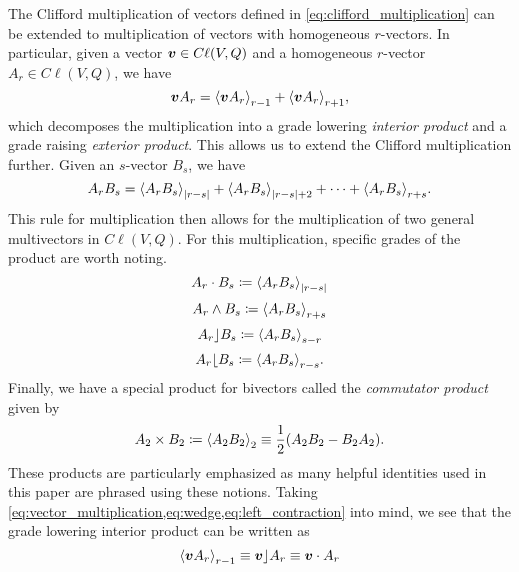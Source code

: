 The Clifford multiplication of vectors defined in \ref{eq:clifford_multiplication} can be extended to multiplication of vectors with homogeneous $r$-vectors.  In particular, given a vector $\blade{v} \in C\ell(V,Q)$ and a homogeneous $r$-vector $A_r \in C\ell(V,Q)$, we have
\begin{equation}
\label{eq:vector_multiplication}
\blade{v}A_r = \proj{r-1}{\blade{v}A_r} + \proj{r+1}{\blade{v}A_r},
\end{equation}
which decomposes the multiplication into a grade lowering \emph{interior product} and a grade raising \emph{exterior product}.  This allows us to extend the Clifford multiplication further. Given an $s$-vector $B_s$, we have
\begin{equation}
\label{eq:general_clifford_multiplication}
A_r B_s = \proj{|r-s|}{A_rB_s} + \proj{|r-s|+2}{A_rB_s} + \cdots + \proj{r+s}{A_rB_s}.
\end{equation}
This rule for multiplication then allows for the multiplication of two general multivectors in $C\ell(V,Q)$. For this multiplication, specific grades of the product are worth noting.
\begin{equation}
\label{eq:dot}
    A_r \cdot B_s \coloneqq \proj{|r-s|}{A_r B_s}
\end{equation}
\begin{equation}
\label{eq:wedge}
    A_r \wedge B_s \coloneqq \proj{r+s}{A_r B_s}
\end{equation}
\begin{equation}
\label{eq:left_contraction}
    A_r \rfloor B_s \coloneqq \proj{s-r}{A_r B_s}
\end{equation}
\begin{equation}
\label{eq:right_contraction}
    A_r \lfloor B_s \coloneqq \proj{r-s}{A_r B_s}.
\end{equation}
Finally, we have a special product for bivectors called the \emph{commutator product} given by
\begin{equation}
\label{eq:commutator_product}
    A_2 \times B_2 \coloneqq \proj{2}{A_2 B_2} \equiv \frac{1}{2} (A_2 B_2 - B_2 A_2).
\end{equation}
These products are particularly emphasized as many helpful identities used in this paper are phrased using these notions. Taking \cref{eq:vector_multiplication,eq:wedge,eq:left_contraction} into mind, we see that the grade lowering interior product can be written as
\begin{equation}
    \proj{r-1}{\blade{v}A_r} \equiv \blade{v}\rfloor A_r \equiv \blade{v} \cdot A_r
\end{equation}
